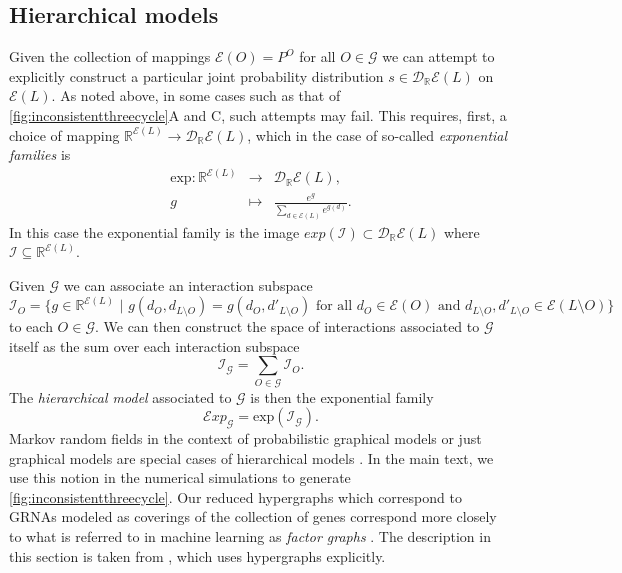 \subsection{Hierarchical models}\label{sec:hierarchicalmodels}
Given the collection of mappings $\mathcal{E}(O) = P^O$ for all $O \in \mathcal{G}$ we can attempt to explicitly construct a particular joint probability distribution $s \in \mathcal{D}_{\mathbb{R}}\mathcal{E}(L)$ on $\mathcal{E}(L)$. As noted above, in some cases such as that of \ref{fig:inconsistentthreecycle}A and C, such attempts may fail. This requires, first, a choice of mapping $\mathbb{R}^{\mathcal{E}(L)} \rightarrow \mathcal{D}_{\mathbb{R}}\mathcal{E}(L)$, which in the case of so-called \emph{exponential families} is
\begin{eqnarray*}
\text{exp} \colon \mathbb{R}^{\mathcal{E}(L)} &\rightarrow& \mathcal{D}_{\mathbb{R}}\mathcal{E}(L),\\
g &\mapsto& \frac{e^g}{\sum_{d \in \mathcal{E}(L)} e^{g(d)}}.
\end{eqnarray*}
In this case the exponential family is the image $exp(\mathcal{I}) \subset \mathcal{D}_{\mathbb{R}}\mathcal{E}(L)$ where $\mathcal{I} \subseteq \mathbb{R}^{\mathcal{E}(L)}$.

Given $\mathcal{G}$ we can associate an interaction subspace
$$
\mathcal{I}_{O} = \{ g \in \mathbb{R}^{\mathcal{E}(L)}\,\, |\,\, g(d_O,d_{L \setminus O}) = g(d_O,d'_{L \setminus O}) \text{ for all } d_O \in \mathcal{E}(O) \text{ and } d_{L \setminus O},d'_{L \setminus O} \in \mathcal{E}(L \setminus O)\}
$$
to each $O \in \mathcal{G}$. We can then construct the space of interactions associated to $\mathcal{G}$ itself as the sum over each interaction subspace
$$
\mathcal{I}_{\mathcal{G}} = \sum_{O \in \mathcal{G}} \mathcal{I}_{O}.
$$
The \emph{hierarchical model} \cite{Lauritzen1996} associated to $\mathcal{G}$ is then the exponential family
$$
\mathcal{E}xp_{\mathcal{G}} = \text{exp}(\mathcal{I}_{\mathcal{G}}).
$$
Markov random fields in the context of probabilistic graphical models or just graphical models are special cases of hierarchical models \cite{Lauritzen1996,Murphy2012}. In the main text, we use this notion in the numerical simulations to generate \ref{fig:inconsistentthreecycle}. Our reduced hypergraphs which correspond to GRNAs modeled as coverings of the collection of genes correspond more closely to what is referred to in machine learning as \emph{factor graphs} \cite{Barber2012,Bishop2007,Murphy2012,Koller2009}. The description in this section is taken from \cite{Lauritzen1996}, which uses hypergraphs explicitly.

